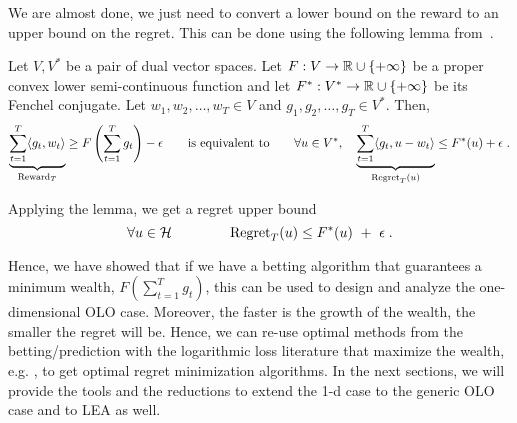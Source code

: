 We are almost done, we just need to convert a lower bound on the reward to an
upper bound on the regret. This can be done using the following lemma
from~\cite{McMahan-Orabona-2014}.
\begin{lemma}
\label{lemma:reward-regret}
Let $V,V^*$ be a pair of dual vector spaces. Let $F:V \to \mathbb{R} \cup \{+\infty\}$
be a proper convex lower semi-continuous function and let $F^*:V^* \to \mathbb{R} \cup
\{+\infty\}$ be its Fenchel conjugate. Let $w_1, w_2, \dots, w_T \in V$ and
$g_1, g_2, \dots, g_T \in V^*$.  Then,
\[
\underbrace{\sum_{t=1}^T \langle g_t, w_t \rangle}_{\operatorname{Reward}_T} \ge F\left( \sum_{t=1}^T g_t \right) -\epsilon
\qquad \text{is equivalent to} \qquad
\forall u \in V^*, \quad
\underbrace{\sum_{t=1}^T \langle g_t, u - w_t\rangle}_{\operatorname{Regret}_T(u)} \le F^*(u) + \epsilon\; .
\]
\end{lemma}
\vspace{-.1cm}
Applying the lemma, we get a regret upper bound
\[
\forall u \in \mathcal{H} \qquad \qquad
\operatorname{Regret}_T(u) \le F^*(u) \ + \ \epsilon \; .
\]

Hence, we have showed that if we have a betting algorithm that guarantees a
minimum wealth, $F(\sum_{t=1}^T g_t)$, this can be used to design and analyze
the one-dimensional \ac{OLO} case. Moreover, the faster is the growth of the wealth, the
smaller the regret will be.  
Hence, we can re-use optimal methods from the betting/prediction with the logarithmic loss literature that maximize the wealth, e.g. \cite[Section 9]{Cesa-Bianchi-Lugosi-2006}, to get optimal regret minimization algorithms.
In the next sections, we will provide the tools and the reductions to extend the 1-d case to the generic \ac{OLO} case and
to \ac{LEA} as well.
